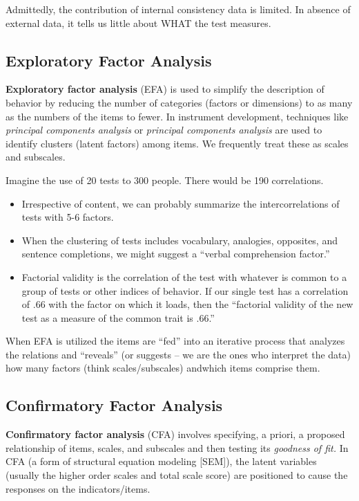 \documentclass[
  english,
]{book}
\providecommand{\tightlist}{%
  \setlength{\itemsep}{0pt}\setlength{\parskip}{0pt}}
\begin{document}
Admittedly, the contribution of internal consistency data is limited. In absence of external data, it tells us little about WHAT the test measures.

\hypertarget{exploratory-factor-analysis}{%
\subsection{Exploratory Factor Analysis}\label{exploratory-factor-analysis}}

\textbf{Exploratory factor analysis} (EFA) is used to simplify the description of behavior by reducing the number of categories (factors or dimensions) to as many as the numbers of the items to fewer. In instrument development, techniques like \emph{principal components analysis} or \emph{principal components analysis} are used to identify clusters (latent factors) among items. We frequently treat these as scales and subscales.

Imagine the use of 20 tests to 300 people. There would be 190 correlations.

\begin{itemize}
\tightlist
\item
  Irrespective of content, we can probably summarize the intercorrelations of tests with 5-6 factors.
\item
  When the clustering of tests includes vocabulary, analogies, opposites, and sentence completions, we might suggest a ``verbal comprehension factor.''
\item
  Factorial validity is the correlation of the test with whatever is common to a group of tests or other indices of behavior. If our single test has a correlation of .66 with the factor on which it loads, then the ``factorial validity of the new test as a measure of the common trait is .66.''
\end{itemize}

When EFA is utilized the items are ``fed'' into an iterative process that analyzes the relations and ``reveals'' (or suggests -- we are the ones who interpret the data) how many factors (think scales/subscales) andwhich items comprise them.

\hypertarget{confirmatory-factor-analysis}{%
\subsection{Confirmatory Factor Analysis}\label{confirmatory-factor-analysis}}

\textbf{Confirmatory factor analysis} (CFA) involves specifying, a priori, a proposed relationship of items, scales, and subscales and then testing its \emph{goodness of fit.} In CFA (a form of structural equation modeling {[}SEM{]}), the latent variables (usually the higher order scales and total scale score) are positioned to cause the responses on the indicators/items.
\end{document}
